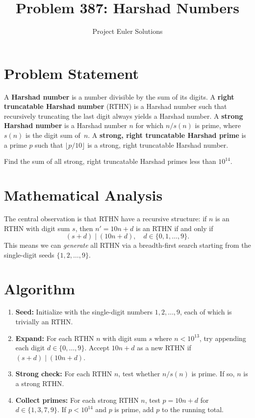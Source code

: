 \documentclass[11pt]{article}
\title{Problem 387: Harshad Numbers}
\author{Project Euler Solutions}
\date{}
\begin{document}
\maketitle

\section{Problem Statement}
A \textbf{Harshad number} is a number divisible by the sum of its digits. A \textbf{right truncatable Harshad number} (RTHN) is a Harshad number such that recursively truncating the last digit always yields a Harshad number. A \textbf{strong Harshad number} is a Harshad number $n$ for which $n / s(n)$ is prime, where $s(n)$ is the digit sum of~$n$. A \textbf{strong, right truncatable Harshad prime} is a prime $p$ such that $\lfloor p/10 \rfloor$ is a strong, right truncatable Harshad number.

Find the sum of all strong, right truncatable Harshad primes less than $10^{14}$.

\section{Mathematical Analysis}
The central observation is that RTHN have a recursive structure: if $n$ is an RTHN with digit sum $s$, then $n' = 10n + d$ is an RTHN if and only if
\[
(s + d) \mid (10n + d), \quad d \in \{0, 1, \dots, 9\}.
\]
This means we can \emph{generate} all RTHN via a breadth-first search starting from the single-digit seeds $\{1, 2, \dots, 9\}$.

\section{Algorithm}
\begin{enumerate}
    \item \textbf{Seed:} Initialize with the single-digit numbers $1, 2, \dots, 9$, each of which is trivially an RTHN.
    \item \textbf{Expand:} For each RTHN $n$ with digit sum $s$ where $n < 10^{13}$, try appending each digit $d \in \{0,\dots,9\}$. Accept $10n + d$ as a new RTHN if $(s+d) \mid (10n+d)$.
    \item \textbf{Strong check:} For each RTHN $n$, test whether $n / s(n)$ is prime. If so, $n$ is a strong RTHN.
    \item \textbf{Collect primes:} For each strong RTHN $n$, test $p = 10n + d$ for $d \in \{1, 3, 7, 9\}$. If $p < 10^{14}$ and $p$ is prime, add $p$ to the running total.
\end{enumerate}
\end{document}
